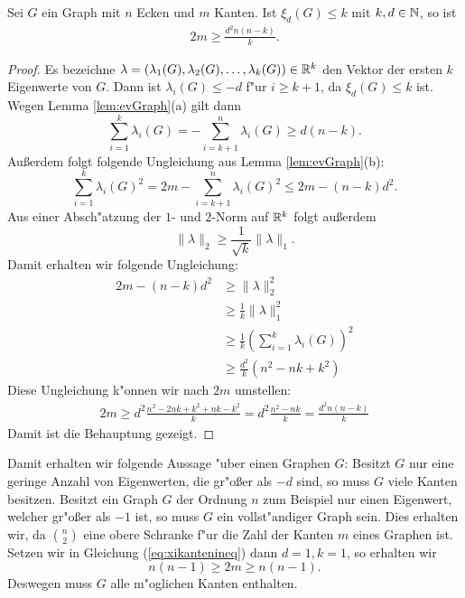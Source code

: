 \begin{theorem}
  Sei $G$ ein Graph mit $n$ Ecken und $m$ Kanten. Ist $\xi_{d}(G) \leq k$ mit $k,d\in{\mathbb{N}}$, so ist
  \begin{align}
    2m \geq \frac{d^{2}n(n-k)}{k}.
    \label{eq:xikantenineq}
  \end{align}
  \label{thm:xikantenschranke}
\end{theorem}

\begin{proof}
  Es bezeichne $\lambda = (\lambda_{1}(G),\lambda_{2}(G), \dots , \lambda_{k}(G))\in {\mathbb{R}}^{k}$ den Vektor der ersten $k$ Eigenwerte von $G$. Dann ist $\lambda_{i}(G) \leq -d$ f"ur $i \geq k+1$, da $\xi_{d}(G) \leq k$ ist.
  Wegen Lemma \ref{lem:evGraph}(a) gilt dann 
  $$
  \sum\limits_{i=1}^{k} \lambda_{i}(G) = - \sum\limits_{i=k+1}^{n} \lambda_{i}(G) \geq d(n-k).
  $$
  Au{\ss}erdem folgt folgende Ungleichung aus Lemma \ref{lem:evGraph}(b):
  $$ \sum\limits_{i=1}^{k} \lambda_{i}(G)^{2} = 2m - \sum\limits_{i=k+1}^{n} \lambda_{i}(G) ^{2} \leq 2m - (n-k)d^{2}.$$
  Aus einer Absch"atzung der $1$- und $2$-Norm auf ${\mathbb{R}}^{k}$ folgt au{\ss}erdem 
  $$\| \lambda \|_{2} \geq \frac{1}{\sqrt{k}} \|\lambda\|_{1}.$$
  Damit erhalten wir folgende Ungleichung:
  \begin{align*}
    2m - (n-k)d^{2} &\geq \| \lambda \| _{2}^{2} \\
    & \geq \frac{1}{k} \| \lambda \| _1^{2} \\
    & \geq \frac{1}{k} ( \sum\limits_{i=1}^{k} \lambda_{i}(G))^{2} \\
    & \geq \frac{d^{2}}{k}(n^{2}-nk+k^{2})
  \end{align*}
  Diese Ungleichung k"onnen wir nach $2m$ umstellen:
  \begin{align*}
    2m \geq d^{2}\frac{n^{2}-2nk + k^{2}+ nk - k^{2} }{k} = d^{2}\frac{n^{2}-nk}{k} = \frac{d^{2}n(n-k)}{k}
  \end{align*}
  Damit ist die Behauptung gezeigt.
\end{proof}
Damit erhalten wir folgende Aussage "uber einen Graphen $G$: Besitzt $G$ nur eine geringe Anzahl von Eigenwerten, die gr"o{\ss}er als $-d$ sind, so muss $G$ viele Kanten besitzen. Besitzt ein Graph $G$ der Ordnung $n$ zum Beispiel nur einen Eigenwert, welcher gr"o{\ss}er als $-1$ ist, so muss $G$ ein vollst"andiger Graph sein. 
Dies erhalten wir, da $\binom{n}{2}$ eine obere Schranke f"ur die Zahl der Kanten $m$ eines Graphen ist. Setzen wir in Gleichung (\ref{eq:xikantenineq}) dann $d=1, k=1$, so erhalten wir 
\begin{equation*}
  n(n-1) \geq 2m \geq n(n-1).
\end{equation*}
Deswegen muss  $G$ alle m"oglichen Kanten enthalten.
